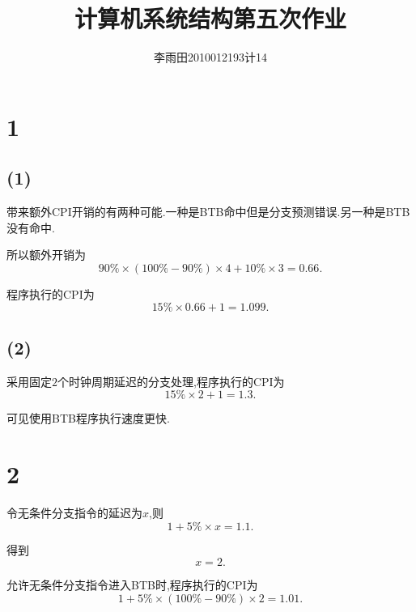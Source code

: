 \documentclass[adobefonts, nocap]{ctexart}
\begin{document}
  \title{计算机系统结构第五次作业}
  \author{李雨田\hspace{1em}2010012193\hspace{1em}计14}
  \maketitle
  \section*{1}
    \subsection*{(1)}
      带来额外CPI开销的有两种可能.一种是BTB命中但是分支预测错误.另一种是BTB没有命中.

      所以额外开销为
      \[
        90\%\times\left(100\%-90\%\right)\times 4+10\%\times 3=0.66.
      \]

      程序执行的CPI为
      \[
        15\%\times 0.66+1=1.099.
      \]
    \subsection*{(2)}
      采用固定$2$个时钟周期延迟的分支处理,程序执行的CPI为
      \[
        15\%\times 2+1=1.3.
      \]

      可见使用BTB程序执行速度更快.
  \section*{2}
    令无条件分支指令的延迟为$x$,则
    \[
      1+5\%\times x=1.1.
    \]

    得到
    \[
      x=2.
    \]

    允许无条件分支指令进入BTB时,程序执行的CPI为
    \[
      1+5\%\times\left(100\%-90\%\right)\times 2=1.01.
    \]
\end{document}
